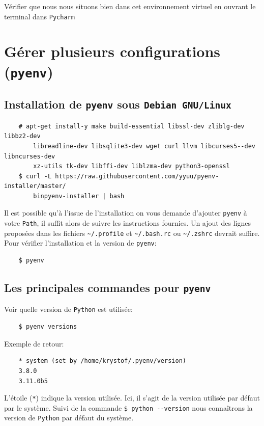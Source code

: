 \documentclass[a4paper,12pt]{book}
\begin{document}
Vérifier que nous nous situons bien dans cet environnement virtuel en ouvrant le terminal dans \texttt{Pycharm}
\medskip

\section{Gérer plusieurs configurations (\texttt{pyenv})}
\subsection*{Installation de \texttt{pyenv} sous \texttt{Debian GNU/Linux}}
\begin{verbatim}
    # apt-get install-y make build-essential libssl-dev zliblg-dev libbz2-dev 
    	libreadline-dev libsqlite3-dev wget curl llvm libcurses5--dev libncurses-dev 
    	xz-utils tk-dev libffi-dev liblzma-dev python3-openssl
    $ curl -L https://raw.githubusercontent.com/yyuu/pyenv-installer/master/
    	binpyenv-installer | bash
\end{verbatim}
\medskip

Il est possible qu'à l'issue de l'installation on vous demande d'ajouter \texttt{pyenv} à votre \texttt{Path}, il suffit alors de suivre les instructions fournies. Un ajout des lignes proposées dans les fichiers \verb|~/.profile| et \verb|~/.bash.rc| ou \verb|~/.zshrc| devrait suffire. Pour vérifier l'installation et la version de \texttt{pyenv}:
\begin{verbatim}
    $ pyenv
\end{verbatim}
\medskip

\subsection*{Les principales commandes pour \texttt{pyenv}}
Voir quelle version de \texttt{Python} est utilisée:
\begin{verbatim}
    $ pyenv versions
\end{verbatim}
\medskip

Exemple de retour:
\begin{verbatim}
    * system (set by /home/krystof/.pyenv/version)
    3.8.0
    3.11.0b5
\end{verbatim}
\medskip

L'étoile (\texttt{*}) indique la version utilisée. Ici, il s'agit de la version utilisée par défaut par le système. Suivi de la commande \verb|$ python --version| nous connaîtrons la version de \texttt{Python} par défaut du système.
\medskip
\end{document}
